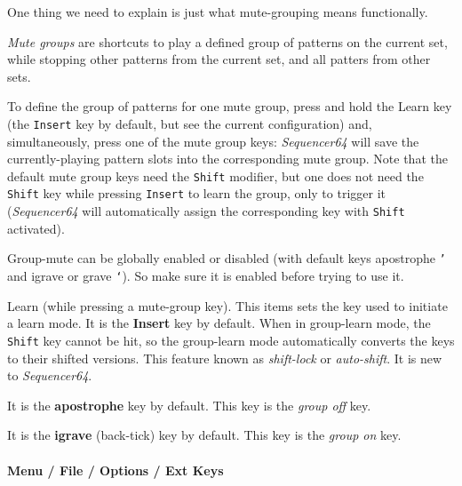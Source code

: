    One thing we need to explain is just what mute-grouping
   means functionally.

   \textsl{Mute groups} are shortcuts to play a defined group of patterns
   on the current set, while stopping other patterns from the current set, and
   all patters from other sets.

   To define the group of patterns for one mute group, press and hold the Learn
   key (the \texttt{Insert} key by default, but see the current configuration)
   and, simultaneously, press one of the mute group keys: \textsl{Sequencer64}
   will save the currently-playing pattern slots into the corresponding mute
   group.  Note that the default mute group keys need the \texttt{Shift}
   modifier, but one does not need the \texttt{Shift} key while pressing
   \texttt{Insert} to learn the group, only to trigger it (\textsl{Sequencer64}
   will automatically assign the corresponding key with \texttt{Shift}
   activated).

   Group-mute can be globally enabled or disabled (with default keys apostrophe
   \texttt{'}   and igrave or grave \texttt{`}).
   So make sure it is enabled before trying to use it.

   Learn (while pressing a mute-group key).
   This items sets the key used to initiate a learn mode.
   It is the \textbf{Insert} key by default.
   When in group-learn mode, the \texttt{Shift} key cannot be hit, so the
   group-learn mode automatically converts the keys to their shifted versions.
   This feature known as \textsl{shift-lock} or \textsl{auto-shift}.
   It is new to \textsl{Sequencer64}.

   It is the \textbf{apostrophe} key by default.
   This key is the \textsl{group off} key.

   It is the \textbf{igrave} (back-tick) key by default.
   This key is the \textsl{group on} key.

\paragraph{Menu / File / Options / Ext Keys }
\label{paragraph:seq64_menu_file_options_ext_keys}

